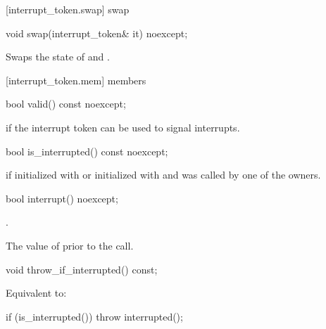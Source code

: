 {%
[interrupt_token.swap]{ swap}

%
\begin{itemdecl}
void swap(interrupt_token& it) noexcept;
\end{itemdecl}

\begin{itemdescr}
\pnum
\effects Swaps the state of  and .
\end{itemdescr}


[interrupt_token.mem]{ members}

%
\begin{itemdecl}
bool valid() const noexcept;
\end{itemdecl}
\begin{itemdescr}
  \pnum\returns {} if the interrupt token can be used to signal interrupts.
\end{itemdescr}

%
\begin{itemdecl}
bool is_interrupted() const noexcept;
\end{itemdecl}
\begin{itemdescr}
  \pnum\returns {} if initialized with 
                or initialized with  and  was called
                by one of the owners.
\end{itemdescr}

%
\begin{itemdecl}
bool interrupt() noexcept;
\end{itemdecl}
\begin{itemdescr}
  \pnum\requires {}

  \pnum\effects {}.

  \pnum\returns The value of  prior to the call.
\end{itemdescr}

%
\begin{itemdecl}
void throw_if_interrupted() const;
\end{itemdecl}
\begin{itemdescr}
  \pnum\effects Equivalent to:
\begin{codeblock}
if (is_interrupted())
  throw interrupted();
\end{codeblock}
\end{itemdescr}


}
